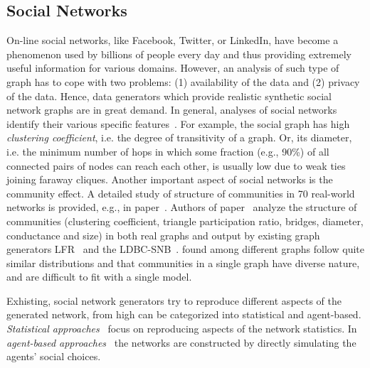 \subsection{Social Networks}
\label{sec:generators_socialnetworks}

On-line social networks, like Facebook, Twitter, or LinkedIn, have become a
phenomenon used by billions of people every day and thus providing extremely
useful information for various domains. However, an analysis of such type of
graph has to cope with two problems: (1) availability of the data and (2)
privacy of the data. Hence, data generators which provide realistic synthetic
social network graphs are in great demand. In general, analyses of social networks identify their various specific
features~\cite{Chakrabarti:2006:GML:1132952.1132954}. For example, the social
graph has high \emph{clustering coefficient}, i.e. the degree of transitivity of
a graph. Or, its diameter, i.e. the minimum number of hops in which some
fraction (e.g., 90\%) of all connected pairs of nodes can reach each other, is
usually low due to weak ties joining faraway cliques. Another important aspect
of social networks is the community effect. A detailed study of structure of
communities in 70 real-world networks is provided, e.g., in
paper~\cite{Leskovec:2008:SPC:1367497.1367591}. Authors of
paper~\cite{Prat-Perez:2014:CSS:2621934.2621942} analyze the structure of
communities (clustering coefficient, triangle participation ratio, bridges,
diameter, conductance and size) in both real graphs and output by existing graph
generators LFR~\cite{PhysRevE.78.046110} and the
LDBC-SNB~\cite{Erling:2015:LSN:2723372.2742786}. %
found among different graphs follow quite similar distributions and that
communities in a single graph have diverse nature, and are difficult to fit with
a single model.

Exhisting, social network generators try to reproduce different aspects of the
generated network, from high can be categorized into statistical and agent-based.
\emph{Statistical
approaches}~\cite{PhysRevE.78.046110,Yao2011,Armstrong:2013:LDB:2463676.2465296,Pham2013,Sukthankar-SocialInfo2014,Erling:2015:LSN:2723372.2742786,Nettleton2016}
focus on reproducing aspects of the network statistics. In \emph{agent-based
approaches}~\cite{Barrett:2009:GAL:1995456.1995598,Bernstein:2013:SAS:2499604.2499609}
the networks are constructed by directly simulating the agents' social choices.

